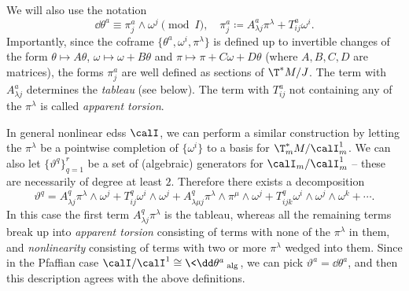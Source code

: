  We will also use the notation 
\[\dd\theta^a\equiv \pi^a_j\wedge\omega^j\pmod{I},\quad \pi^a_j\coloneqq A^a_{\lambda j}\pi^\lambda+T^a_{ij}\omega^i.\]
Importantly, since the coframe $\{\theta^a,\omega^i,\pi^\lambda\}$ is defined up to invertible changes of the form $\theta\mapsto A\theta$, $\omega\mapsto \omega+B\theta$ and $\pi\mapsto \pi+C\omega+D\theta$ (where $A,B,C,D$ are matrices), the forms $\pi^a_j$ are well defined as sections of $\T^\ast M\slash J$. The term with $A^a_{\lambda j}$ determines the \emph{tableau} (see below). The term with $T^a_{ij}$ not containing any of the $\pi^\lambda$ is called \emph{apparent torsion}.

\begin{rem}
    In general nonlinear \glspl{eds} $\calI$, we can perform a similar construction by letting the $\pi^\lambda$ be a pointwise completion of $\{\omega^i\}$ to a basis for $\T_m^\ast M\slash \calI^1_m$. We can also let  $\{\vartheta^q\}_{q=1}^r$  be a set of (algebraic) generators for $\calI_m\slash \calI^1_m$ -- these are necessarily of degree at least $2$. Therefore there exists a decomposition 
    \[\vartheta^q=A^q_{\lambda j}\pi^\lambda\wedge\omega^j+T^q_{ij}\omega^i\wedge\omega^j + A^q_{\lambda\mu j}\pi^\lambda\wedge\pi^\mu\wedge \omega^j + T^q_{ijk}\omega^i\wedge\omega^j\wedge\omega^k+\cdots. \]
    In this case the first term $A^q_{\lambda j}\pi^\lambda$ is the tableau, whereas all the remaining terms break up into \emph{apparent torsion} consisting of terms with none of the $\pi^\lambda$ in them, and \emph{nonlinearity} consisting of terms with two or more $\pi^\lambda$ wedged into them. Since in the Pfaffian case $\calI\slash \calI^1\cong \<\dd\theta^a\>_{\mathrm{alg}}$, we can pick $\vartheta^a=\dd\theta^a$, and then this description agrees with the above definitions.
\end{rem}


